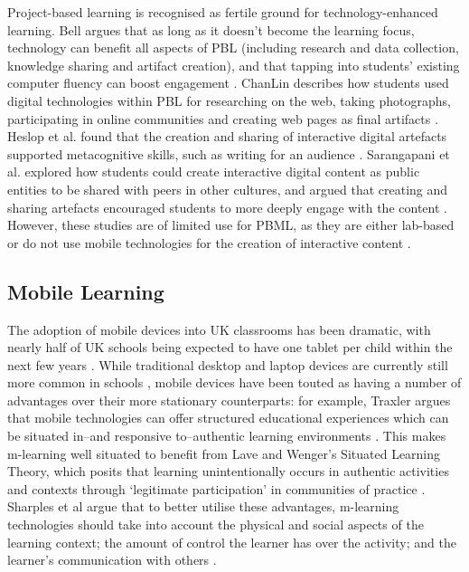 \documentclass[,hyphens]{sigchi}
\begin{document}
Project-based learning is recognised as fertile ground for technology-enhanced learning. Bell argues that as long as it doesn't become the learning focus, technology can benefit all aspects of PBL (including research and data collection, knowledge sharing and artifact creation), and that tapping into students' existing computer fluency can boost engagement \cite{Bell2010}. ChanLin describes how students used digital technologies within PBL for researching on the web, taking photographs, participating in online communities and creating web pages as final artifacts \cite{ChanLin2008}. Heslop et al. found that the creation and sharing of interactive digital artefacts supported metacognitive skills, such as writing for an audience \cite{Heslop2017}. Sarangapani et al. explored how students could create interactive digital content as public entities to be shared with peers in other cultures, and argued that creating and sharing artefacts encouraged students to more deeply engage with the content \cite{Sarangapani2018}. However, these studies are of limited use for PBML, as they are either lab-based \cite{Heslop2017} or do not use mobile technologies for the creation of interactive content \cite{Sarangapani2018, ChanLin2008}.

\subsection{Mobile Learning}
The adoption of mobile devices into UK classrooms has been dramatic, with nearly half of UK schools being expected to have one tablet per child within the next few years \cite{BritishEducationalSuppliersAssociation2015}. While traditional desktop and laptop devices are currently still more common in schools \cite{BritishEducationalSuppliersAssociation2017}, mobile devices have been touted as having a number of advantages over their more stationary counterparts: for example, Traxler argues that mobile technologies can offer structured educational experiences which can be situated in--and responsive to--authentic learning environments \cite{Traxler2011}. This makes m-learning well situated to benefit from Lave and Wenger's Situated Learning Theory, which posits that learning unintentionally occurs in authentic activities and contexts through `legitimate participation' in communities of practice \cite{Lave1991}. Sharples et al argue that to better utilise these advantages, m-learning technologies should take into account the physical and social aspects of the learning context; the amount of control the learner has over the activity; and the learner's communication with others \cite{Sharples2007}.
\end{document}
